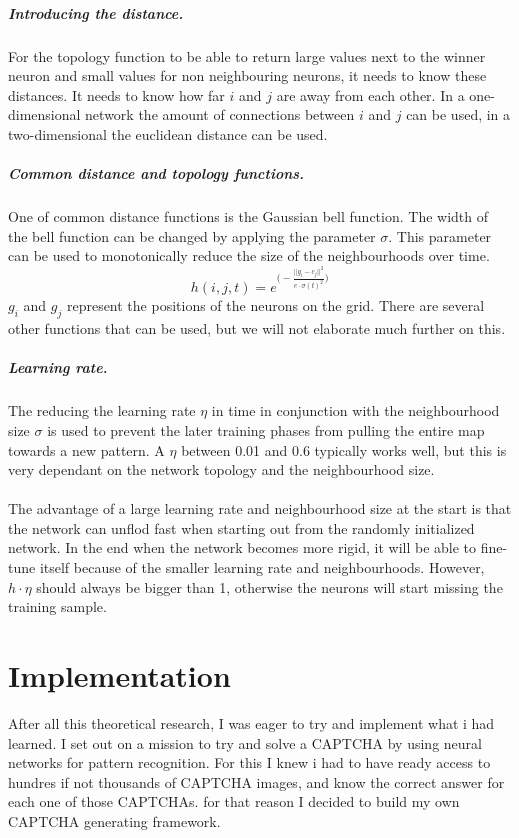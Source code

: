 \documentclass[pdftex,a4paper,12pt,twoside]{report}
\theoremstyle{plain} \newtheorem{theorem}{Theorem} \newtheorem{proposition}{Proposition} \newtheorem{lemma}{Lemma} \newtheorem*{corollary}{Corollary}
\theoremstyle{definition} \newtheorem{definition}{Definition} \newtheorem{conjecture}{Conjecture} \newtheorem*{example}{Example} \newtheorem{algorithm}{Algorithm}
\theoremstyle{remark} \newtheorem*{remark}{Remark} \newtheorem*{note}{Note} \newtheorem{case}{Case}
\begin{document}
\subparagraph{Introducing the distance.}
For the topology function to be able to return large values next to the winner neuron and small values for non neighbouring neurons, it needs to know these distances. It needs to know how far $i$ and $j$ are away from each other. In a one-dimensional network the amount of connections between $i$ and $j$ can be used, in a two-dimensional the euclidean distance can be used.
\subparagraph{Common distance and topology functions.}
One of common distance functions is the Gaussian bell function. The width of the bell function can be changed by applying the parameter $\sigma$. This parameter can be used to monotonically reduce the size of the neighbourhoods over time.
\begin{equation}
h(i,j,t) = e^{ \big( - \frac{||g_i-c_j||^2}{e \cdot \sigma (t)^2} \big) }
\end{equation}
$g_i$ and $g_j$ represent the positions of the neurons on the grid. There are several other functions that can be used, but we will not elaborate much further on this.
\subparagraph{Learning rate.}
The reducing the learning rate $\eta$ in time in conjunction with the neighbourhood size $\sigma$ is used to prevent the later training phases from pulling the entire map towards a new pattern. A $\eta$ between 0.01 and 0.6 typically works well, but this is very dependant on the network topology and the neighbourhood size.\\\\The advantage of a large learning rate and neighbourhood size at the start is that the network can unflod fast when starting out from the randomly initialized network. In the end when the network becomes more rigid, it will be able to fine-tune itself because of the smaller learning rate and neighbourhoods. However, $h \cdot \eta$ should always be bigger than 1, otherwise the neurons will start missing the training sample.
\section{Implementation}
\label{sec:implementation}
After all this theoretical research, I was eager to try and implement what i had learned. I set out on a mission to try and solve a CAPTCHA by using neural networks for pattern recognition. For this I knew i had to have ready access to hundres if not thousands of CAPTCHA images, and know the correct answer for each one of those CAPTCHAs. for that reason I decided to build my own CAPTCHA generating framework.
\end{document}
